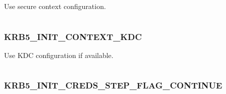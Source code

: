 \documentclass[letterpaper,10pt,english]{sphinxmanual}
\begin{document}
\begin{fulllineitems}
\label{appdev/refs/macros/KRB5_INIT_CONTEXT_SECURE:KRB5_INIT_CONTEXT_SECURE}
\end{fulllineitems}


Use secure context configuration.

\begin{tabulary}{\linewidth}{|L|L|}
\hline

 & 
\\\hline
\end{tabulary}



\subsubsection{KRB5\_INIT\_CONTEXT\_KDC}
\label{appdev/refs/macros/KRB5_INIT_CONTEXT_KDC:krb5-init-context-kdc}\label{appdev/refs/macros/KRB5_INIT_CONTEXT_KDC::doc}\label{appdev/refs/macros/KRB5_INIT_CONTEXT_KDC:krb5-init-context-kdc-data}

\begin{fulllineitems}
\label{appdev/refs/macros/KRB5_INIT_CONTEXT_KDC:KRB5_INIT_CONTEXT_KDC}
\end{fulllineitems}


Use KDC configuration if available.

\begin{tabulary}{\linewidth}{|L|L|}
\hline

 & 
\\\hline
\end{tabulary}



\subsubsection{KRB5\_INIT\_CREDS\_STEP\_FLAG\_CONTINUE}
\label{appdev/refs/macros/KRB5_INIT_CREDS_STEP_FLAG_CONTINUE:krb5-init-creds-step-flag-continue-data}\label{appdev/refs/macros/KRB5_INIT_CREDS_STEP_FLAG_CONTINUE:krb5-init-creds-step-flag-continue}\label{appdev/refs/macros/KRB5_INIT_CREDS_STEP_FLAG_CONTINUE::doc}

\begin{fulllineitems}
\label{appdev/refs/macros/KRB5_INIT_CREDS_STEP_FLAG_CONTINUE:KRB5_INIT_CREDS_STEP_FLAG_CONTINUE}
\end{fulllineitems}
\end{document}
